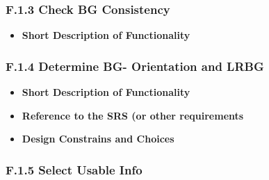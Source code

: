 \documentclass{template/openetcs_article}
\begin{document}
\subsubsection{F.1.3 Check BG Consistency}

\begin{itemize}
\item \textbf{Short Description of Functionality}\\


\end{itemize}

\subsubsection{F.1.4 Determine BG- Orientation and LRBG}
\begin{itemize}
	\item \textbf{Short Description of Functionality}\\
	\item \textbf{Reference to the SRS (or other requirements}\\
	\item \textbf{Design Constrains and Choices}\\
\end{itemize}

\subsubsection{F.1.5 Select Usable Info}
\end{document}
